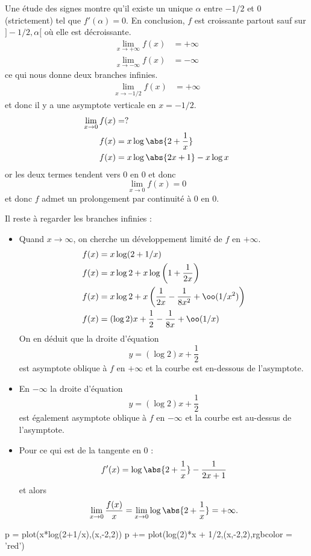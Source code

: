 Une étude des signes montre qu'il existe un unique $\alpha$ entre $-1/2$ et $0$ (strictement) tel que $f'(\alpha) = 0$.
En conclusion, $f$ est croissante partout sauf sur $]-1/2,\alpha[$ où elle est décroissante.
\begin{align*}
\lim_{x\to+\infty}f(x) &= +\infty \\
\lim_{x\to -\infty}f(x) &= -\infty
\end{align*}
ce qui nous donne deux branches infinies.
\begin{align*}
\lim_{x\to -1/2}f(x) &=+\infty
\end{align*}
et donc il y a une asymptote verticale en $x=-1/2$.
\begin{align*}
\lim_{x\to 0}f(x) &= ?\\
f(x) &= x\log\abs{2+\frac{1}{x}}\\
f(x) &= x\log\abs{2x+1}-x\log x
\end{align*}
or les deux termes tendent vers $0$ en $0$ et donc \[ \lim_{x\to 0}f(x) = 0\]et donc $f$ admet un prolongement par continuité à $0$ en $0$.

Il reste à regarder les branches infinies :
\begin{itemize}
\item Quand $x\to \infty$, on cherche un développement limité de $f$ en $+\infty$.
\begin{align*}
f(x) &= x\log(2+1/x) \\
f(x) &= x\log2+x\log\left(1+\frac{1}{2x}\right)\\
f(x) &= x\log 2 + x\left(\frac{1}{2x}-\frac{1}{8x^{2}}+\oo(1/x^{2})\right)\\
f(x) &= (\log 2)x + \frac{1}{2} -\frac{1}{8x} + \oo(1/x)
\end{align*}
On en déduit que la droite d'équation \[y = (\log 2)x +\frac{1}{2} \]est asymptote oblique à $f$  en $+\infty$ et la courbe est en-dessous de l'asymptote.
\item En $-\infty$ la droite d'équation \[ y = (\log 2)x + \frac{1}{2}\]est également asymptote oblique à $f$ en $-\infty$ et la courbe est au-dessus de l'asymptote.
\item Pour ce qui est de la tangente en $0$ : \[f'(x) = \log\abs{2+\frac{1}{x}} - \frac{1}{2x+1}\]et alors \[ \lim_{x\to 0}\frac{f(x)}{x} = \lim_{x\to 0}\log\abs{2 + \frac{1}{x}} = +\infty.\]
\end{itemize}
\begin{center}
\begin{sagesilent}
p = plot(x*log(2+1/x),(x,-2,2))
p += plot(log(2)*x + 1/2,(x,-2,2),rgbcolor = 'red')
\end{sagesilent}
\end{center}















